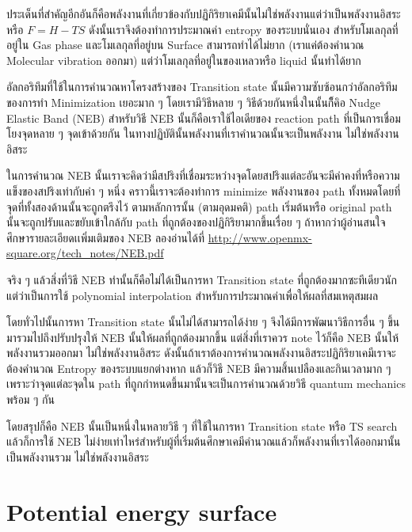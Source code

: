 ประเด็นที่สำคัญอีกอันก็คือพลังงานที่เกี่ยวข้องกับปฏิกิริยาเคมีนั้นไม่ใช่พลังงานแต่ว่าเป็นพลังงานอิสระหรือ $F = H - TS$ 
ดังนั้นเราจึงต้องทำการประมาณค่า entropy ของระบบนั่นเอง สำหรับโมเลกุลที่อยู่ใน Gas phase 
และโมเลกุลที่อยู่บน Surface สามารถทำได้ไม่ยาก (เราแค่ต้องคำนวณ Molecular vibration ออกมา) 
แต่ว่าโมเลกุลที่อยู่ในของเหลวหรือ liquid นั้นทำได้ยาก

อัลกอริทึมที่ใช้ในการคำนวณหาโครงสร้างของ Transition state นั้นมีความซับซ้อนกว่าอัลกอริทึมของการทำ 
Minimization เยอะมาก ๆ โดยเรามีวิธีหลาย ๆ วิธีด้วยกันหนึ่งในนั้นก็ึคิอ Nudge Elastic Band (NEB) 
สำหรับวิธี NEB นั้นก็คือเราใช้ไอเดียของ reaction path ที่เป็นการเชื่อมโยงจุดหลาย ๆ จุดเข้าด้วยกัน 
ในทางปฏิบัตินั้นพลังงานที่เราคำนวณนั้นจะเป็นพลังงาน ไม่ใช่พลังงานอิสระ

ในการคำนวณ NEB นั้นเราจะคิดว่ามีสปริงที่เชื่อมระหว่างจุดโดยสปริงแต่ละอันจะมีค่าคงที่หรือความแข็งของสปริงเท่ากับค่า ๆ หนึ่ง 
คราวนี้เราจะต้องทำการ minimize พลังงานของ path ทั้งหมดโดยที่จุดที่ทั้งสองด้านนั้นจะถูกตรึงไว้ ตามหลักการนั้น 
(ตามอุดมคติ) path เริ่มต้นหรือ original path นั้นจะถูกปรับและขยับเข้าใกล้กับ path ที่ถูกต้องของปฏิกิริยามากขึ้นเรื่อย ๆ 
ถ้าหากว่าผู้อ่านสนใจศึกษารายละเอียดเเพิ่มเติมของ NEB ลองอ่านได้ที่ 
\url{http://www.openmx-square.org/tech_notes/NEB.pdf}

จริง ๆ แล้วสิ่งที่วิธี NEB ทำนั้นก็คือไม่ได้เป็นการหา Transition state ที่ถูกต้องมากซะทีเดียวนักแต่ว่าเป็นการใช้ 
polynomial interpolation สำหรับการประมาณค่าเพื่อให้ผลที่สมเหตุสมผล 

โดยทั่วไปนั้นการหา Transition state นั้นไม่ได้สามารถได้ง่าย ๆ จึงได้มีการพัฒนาวิธีการอื่น ๆ ขึ้นมารวมไปถึงปรับปรุงให้ 
NEB นั้นให้ผลที่ถูกต้องมากขึ้น แต่สิ่งที่เราควร note ไว้ก็คือ NEB นั้นให้พลังงานรวมออกมา ไม่ใช่พลังงานอิสระ 
ดังนั้นถ้าเราต้องการคำนวณพลังงานอิสระปฏิกิริยาเคมีเราจะต้องคำนวณ Entropy ของระบบแยกต่างหาก 
แล้วก็วิธี NEB มีความสิ้นเปลืองและกินเวลามาก ๆ เพราะว่าจุดแต่ละจุดใน path ที่ถูกกำหนดขึ้นมานั้นจะเป็นการคำนวณด้วยวิธี 
quantum mechanics พร้อม ๆ กัน 

โดยสรุปก็คือ NEB นั้นเป็นหนึ่งในหลายวิธี ๆ ที่ใช้ในการหา Transition state หรือ TS search แล้วก็การใช้ NEB 
ไม่ง่ายเท่าไหร่สำหรับผู้ที่เริ่มต้นศึกษาเคมีคำนวณแล้วก็พลังงานที่เราได้ออกมานั้นเป็นพลังงานรวม ไม่ใช่พลังงานอิสระ 

\section{Potential energy surface}

